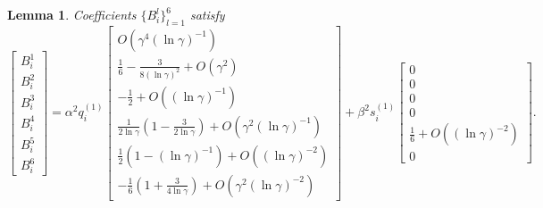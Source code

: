 \documentclass[11pt,letterpaper]{amsart}
\newtheorem{lemma}[theorem]{Lemma}
\theoremstyle{definition}
\theoremstyle{remark}
\numberwithin{equation}{section}
\begin{document}
\begin{lemma}\label{corfficient-f}
    Coefficients $\{B^l_i\}_{l=1}^6$ satisfy
    \begin{equation*}
    \begin{bmatrix}
        B_i^1\\
        B_i^2\\
        B_i^3\\
        B_i^4\\
        B_i^5\\
        B_i^6
    \end{bmatrix}=\alpha^2 q^{(1)}_i\begin{bmatrix}
        O(\gamma^4(\ln \gamma)^{-1})\\
        \frac{1}{6}-\frac{3}{8(\ln \gamma)^2}+O(\gamma^2)\\
        -\frac{1}{2}+O((\ln \gamma)^{-1})\\
        \frac{1}{2\ln \gamma}\left(1-\frac{3}{2\ln \gamma}\right)+O( \gamma^2 (\ln \gamma)^{-1})\\
        \frac{1}{2}\left(1-(\ln \gamma)^{-1}\right)+O((\ln \gamma)^{-2})\\
        -\frac{1}{6}\left(1+\frac{3}{4\ln \gamma}\right)+O(\gamma^2 (\ln \gamma)^{-2})
    \end{bmatrix}
    +\beta^2s^{(1)}_i \begin{bmatrix}
        0\\
       0\\
       0\\
       0\\
       \frac{1}{6}+O((\ln \gamma)^{-2})\\
      0
    \end{bmatrix}.
\end{equation*}
\end{lemma}
\end{document}

